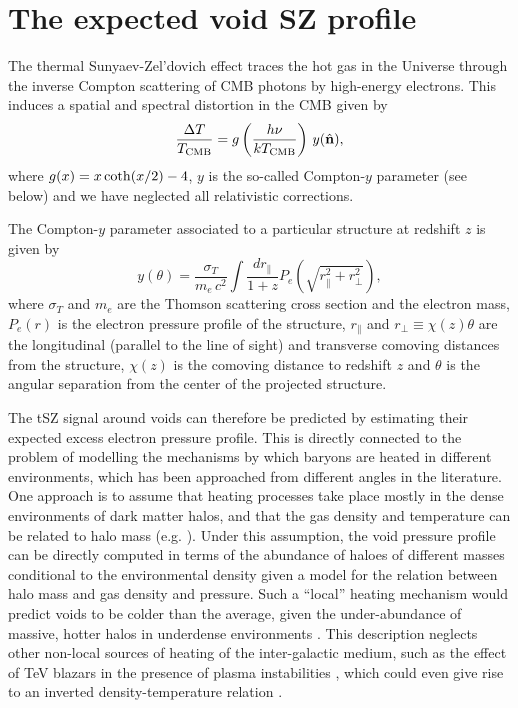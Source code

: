 \documentclass[twocolumn,amsfont,amssymb,amsmath, showpacs,balancelastpage, nofootinbib]{revtex4-1}
\newcommand{\nv}{\hat{\bf n}}
\newcommand{\DAM}[1]{{\color{red}{\bf DA: #1}}}
\begin{document}
  \section{The expected void SZ profile}\label{sec:theory}
    The thermal Sunyaev-Zel'dovich effect \cite{1972CoASP...4..173S} traces the hot gas in the
    Universe through the inverse Compton scattering of CMB photons by high-energy electrons.
    This induces a spatial and spectral distortion in the CMB given by
    \begin{equation}
      \frac{\Delta T}{T_{\rm CMB}}=g\left(\frac{h\nu}{kT_{\rm CMB}}\right)\,y(\nv),
    \end{equation}
    where $g(x)=x\,{\rm coth}(x/2)-4$, $y$ is the so-called Compton-$y$ parameter (see below)
    and we have neglected all relativistic corrections.
  
    The Compton-$y$ parameter associated to a particular structure at redshift $z$ is given by
    \begin{equation}\label{eq:sz_main}
      y(\theta)=\frac{\sigma_T}{m_e\,c^2}\int\frac{dr_\parallel}{1+z}P_e
      \left(\sqrt{r_\parallel^2+r_\perp^2}\right),
    \end{equation}
    where $\sigma_T$ and $m_e$ are the Thomson scattering cross section and the electron mass,
    $P_e(r)$ is the electron pressure profile of the structure, $r_\parallel$ and $r_\perp\equiv
    \chi(z)\theta$ are the longitudinal (parallel to the line of sight) and transverse comoving
    distances from the structure, $\chi(z)$ is the comoving distance to redshift $z$ and $\theta$
    is the angular separation from the center of the projected structure.
    
    The tSZ signal around voids can therefore be predicted by estimating their expected excess
    electron pressure profile. This is directly connected to the problem of modelling the
    mechanisms by which baryons are heated in different environments, which has been approached
    from different angles in the literature. One approach is to assume that heating processes
    take place mostly in the dense environments of dark matter halos, and that the gas density and
    temperature can be related to halo mass (e.g. \cite{2001MNRAS.327.1353K} \DAM{add other
    relevant references?}). Under this assumption, the void pressure profile can be directly
    computed in terms of the abundance of haloes of different masses conditional to the
    environmental density given a model for the relation between halo mass and gas density and
    pressure. Such a ``local'' heating mechanism would predict voids to be colder than the
    average, given the under-abundance of massive, hotter halos in underdense environments 
    \cite{1996MNRAS.282..347M}. This description neglects other non-local sources of heating
    of the inter-galactic medium, such as the effect of TeV blazars in the presence of plasma
    instabilities \cite{2012ApJ...752...23C}, which could even give rise to an inverted
    density-temperature relation \cite{2008MNRAS.386.1131B} \DAM{not sure if we should be citing
    other models}.
    
\end{document}
